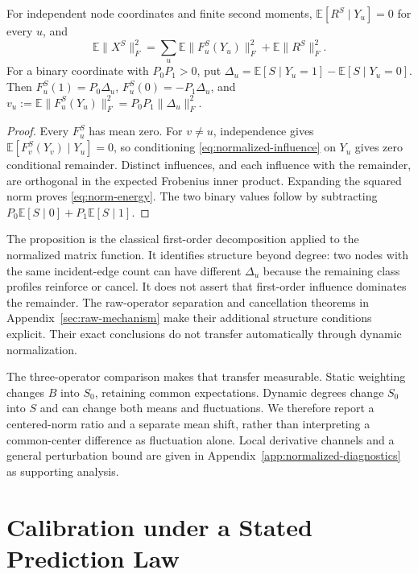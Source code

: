 \begin{proposition}\label{prop:norm-influence}
For independent node coordinates and finite second moments,
$\mathbb E[R^S\mid Y_u]=0$ for every $u$, and
\begin{equation}\label{eq:norm-energy}
\mathbb E\|X^S\|_F^2
=\sum_u\mathbb E\|F_u^S(Y_u)\|_F^2+\mathbb E\|R^S\|_F^2.
\end{equation}
For a binary coordinate with $P_0P_1>0$, put
$\Delta_u=\mathbb E[S\mid Y_u=1]-\mathbb E[S\mid Y_u=0]$.
Then $F_u^S(1)=P_0\Delta_u$, $F_u^S(0)=-P_1\Delta_u$, and
$v_u:=\mathbb E\|F_u^S(Y_u)\|_F^2=P_0P_1\|\Delta_u\|_F^2$.
\end{proposition}
\begin{proof}
Every $F_u^S$ has mean zero. For $v\ne u$, independence gives
$\mathbb E[F_v^S(Y_v)\mid Y_u]=0$, so conditioning
\eqref{eq:normalized-influence} on $Y_u$ gives zero conditional
remainder. Distinct influences, and each influence with the remainder,
are orthogonal in the expected Frobenius inner product. Expanding the
squared norm proves \eqref{eq:norm-energy}. The two binary values follow
by subtracting $P_0\mathbb E[S\mid0]+P_1\mathbb E[S\mid1]$.
\end{proof}

The proposition is the classical first-order decomposition applied to
the normalized matrix function. It identifies structure beyond degree:
two nodes with the same incident-edge count can have different
$\Delta_u$ because the remaining class profiles reinforce or cancel.
It does not assert that first-order influence dominates the remainder.
The raw-operator separation and cancellation theorems in
Appendix~\ref{sec:raw-mechanism} make their additional structure
conditions explicit. Their exact conclusions do not transfer
automatically through dynamic normalization.

The three-operator comparison makes that transfer measurable. Static
weighting changes $B$ into $S_0$, retaining common expectations. Dynamic
degrees change $S_0$ into $S$ and can change both means and fluctuations.
We therefore report a centered-norm ratio and a separate mean shift,
rather than interpreting a common-center difference as fluctuation
alone. Local derivative channels and a general perturbation bound are
given in Appendix~\ref{app:normalized-diagnostics} as supporting analysis.

\section{Calibration under a Stated Prediction Law}\label{sec:calibration}

